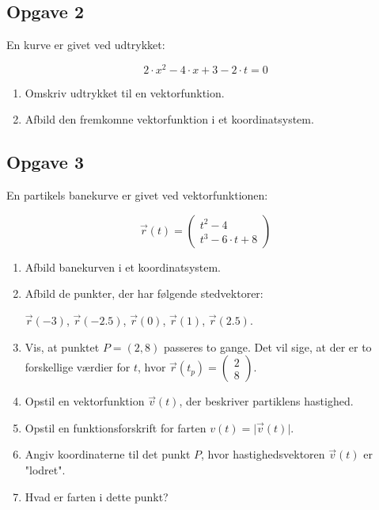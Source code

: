 \documentclass[a4paper, 12pt]{article}
\begin{document}
\subsection*{Opgave 2}
\label{sec:org93a33cb}

En kurve er givet ved udtrykket:

$$2 \cdot x^2 - 4 \cdot x + 3 - 2\cdot t = 0$$

\begin{enumerate}
\item Omskriv udtrykket til en vektorfunktion.

\item Afbild den fremkomne vektorfunktion i et koordinatsystem.
\end{enumerate}
\subsection*{Opgave 3}
\label{sec:orgbb5e609}

En partikels banekurve er givet ved vektorfunktionen:

$$\vec{r}(t) = \begin{pmatrix} t^2 - 4 \\ t^3 - 6\cdot t +8 \end{pmatrix}$$

\begin{enumerate}
\item Afbild banekurven i et koordinatsystem.

\item Afbild de punkter, der har følgende stedvektorer:

\(\vec{r}(-3)\), \(\vec{r}(-2.5)\), \(\vec{r}(0)\), \(\vec{r}(1)\), \(\vec{r}(2.5)\).

\item Vis, at punktet \(P=(2,8)\) passeres to gange. Det vil sige, at der er to forskellige værdier for \(t\), hvor \(\vec{r}(t_p) = \begin{pmatrix} 2 \\ 8 \end{pmatrix}\).

\item Opstil en vektorfunktion \(\vec{v}(t)\), der beskriver partiklens hastighed.

\item Opstil en funktionsforskrift for farten \(v(t) = \lvert \vec{v}(t)\rvert\).

\item Angiv koordinaterne til det punkt \(P\), hvor hastighedsvektoren \(\vec{v}(t)\) er "lodret".

\item Hvad er farten i dette punkt?
\end{enumerate}
\end{document}
